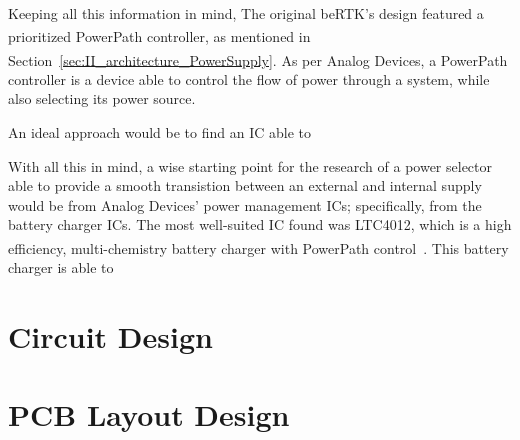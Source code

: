 Keeping all this information in mind, 
The original beRTK\textsuperscript{\textregistered}'s design featured a prioritized PowerPath\textsuperscript{\texttrademark} controller, as mentioned in Section~\ref{sec:II_architecture_PowerSupply}. As per Analog Devices, a PowerPath\textsuperscript{\texttrademark} controller is a device able to control the flow of power through a system, while also selecting its power source.


An ideal approach would be to find an IC able to 

With all this in mind, a wise starting point for the research of a power selector able to provide a smooth transistion between an external and internal supply would be from Analog Devices' power management ICs; specifically, from the battery charger ICs. The most well-suited IC found was LTC4012, which is a high efficiency, multi-chemistry battery charger with PowerPath\textsuperscript{\texttrademark} control~\cite{LTC4012}. This battery charger is able to

\section{Circuit Design}\label{32_Circuit}

\section{PCB Layout Design}\label{33_PCBlayout}

